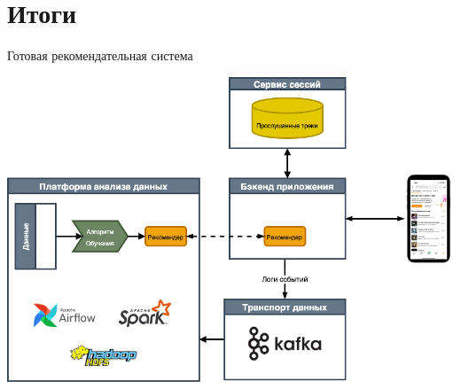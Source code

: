 \documentclass[11pt,aspectratio=169]{beamer}
\begin{document}
{
\begin{frame}[plain]
\end{frame}
}

\section{Итоги}

{
\begin{frame}[plain]
\end{frame}
}

\begin{frame}{Готовая рекомендательная система}
\begin{center}
\includegraphics[scale=0.3]{images/architecture.png}
\end{center}
\end{frame}
\end{document}
